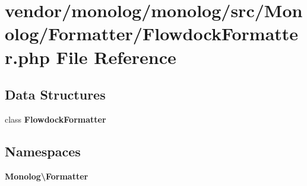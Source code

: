 \section{vendor/monolog/monolog/src/\+Monolog/\+Formatter/\+Flowdock\+Formatter.php File Reference}
\label{_flowdock_formatter_8php}
\subsection*{Data Structures}
\begin{DoxyCompactItemize}
\item 
class {\bf Flowdock\+Formatter}
\end{DoxyCompactItemize}
\subsection*{Namespaces}
\begin{DoxyCompactItemize}
\item 
 {\bf Monolog\textbackslash{}\+Formatter}
\end{DoxyCompactItemize}
